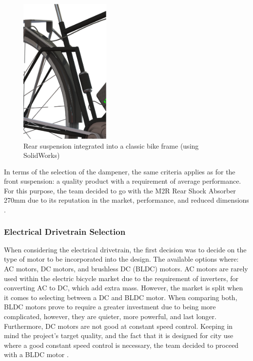 \documentclass[a4paper,11pt]{article}
\begin{document}
\begin{figure}[ht]
	\centering
	\includegraphics[width=0.4\textwidth]{ourhor}
	\caption{Rear suspension integrated into a classic bike frame (using SolidWorks)}
	\label{fig:ourhor}
\end{figure}

\newpage

In terms of the selection of the dampener, the same criteria applies as for the front suspension: a quality product with a requirement of average performance. For this purpose, the team decided to go with the M2R Rear Shock Absorber 270mm due to its reputation in the market, performance, and reduced dimensions \cite{m2r}. 

\subsubsection{Electrical Drivetrain Selection}

When considering the electrical drivetrain, the first decision was to decide on the type of motor to be incorporated into the design. The available options where: AC motors, DC motors, and brushless DC (BLDC) motors. AC motors are rarely used within the electric bicycle market due to the requirement of inverters, for converting AC to DC, which add extra mass. However, the market is split when it comes to selecting between a DC and BLDC motor. When comparing both, BLDC motors prove to require a greater investment due to being more complicated, however, they are quieter, more powerful, and last longer. Furthermore, DC motors are not good at constant speed control. Keeping in mind the project's target quality, and the fact that it is designed for city use where a good constant speed control is necessary, the team decided to proceed with a BLDC motor \cite{rag14}. 
\end{document}
